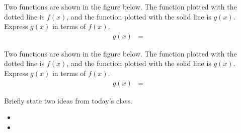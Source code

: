 \begin{problem}
  \clearpage

\item Two functions are shown in the figure below. The function
  plotted with the dotted line is $f(x)$, and the function plotted
  with the solid line is $g(x)$. Express $g(x)$ in terms of $f(x)$,
  \begin{eqnarray*}
    g(x) & = & 
  \end{eqnarray*}

  \scalebox{0.95}{}

  \clearpage

\item Two functions are shown in the figure below. The function
  plotted with the dotted line is $f(x)$, and the function plotted
  with the solid line is $g(x)$. Express $g(x)$ in terms of $f(x)$.
  \begin{eqnarray*}
    g(x) & = & 
  \end{eqnarray*}

  \scalebox{0.95}{}


\end{problem}

\postClass

\begin{problem}
\item Briefly state two ideas from today's class.
  \begin{itemize}
  \item 
  \item 
  \end{itemize}
\item 
  \begin{subproblem}
    \item
  \end{subproblem}
\end{problem}



